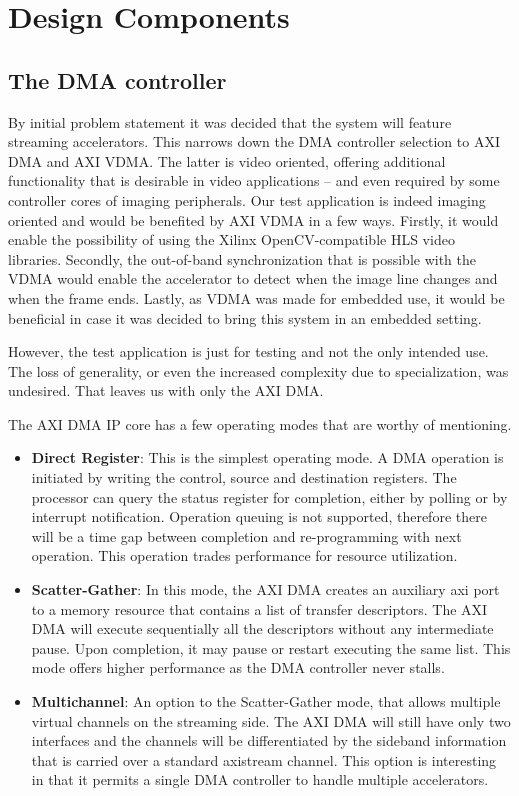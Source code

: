 \section{Design Components}

\subsection{The DMA controller}
\label{sec:axidma}

By initial problem statement it was decided that the system will feature
streaming accelerators. This narrows down the DMA controller selection
to AXI DMA and AXI VDMA. The latter is video oriented, offering additional
functionality that is desirable in video applications -- and even required
by some controller cores of imaging peripherals. Our test application
is indeed imaging oriented and would be benefited by AXI VDMA in a few ways.
Firstly, it would enable the possibility of using the Xilinx OpenCV-compatible
HLS video libraries. Secondly, the out-of-band synchronization that is possible
with the VDMA would enable the accelerator to detect when the image line changes
and when the frame ends. Lastly, as VDMA was made for embedded use, it would be
beneficial in case it was decided to bring this system in an embedded setting.

However, the test application is just for testing and not the only intended use.
The loss of generality, or even the increased complexity due to specialization,
was undesired. That leaves us with only the AXI DMA.

The AXI DMA IP core has a few operating modes that are worthy of mentioning.

\begin{itemize}
\item	\textbf{Direct Register}: 
	This is the simplest operating mode. A DMA operation is initiated 
	by writing the control, source and destination registers.
	The processor can query the status register for completion, 
	either by polling or by interrupt notification.
	Operation queuing is not supported, therefore there will be a time gap 
	between completion and re-programming with next operation.
	This operation trades performance for resource utilization.
\item	\textbf{Scatter-Gather}:
	In this mode, the AXI DMA creates an auxiliary \gls{axi} port
	to a memory resource that contains a list of transfer descriptors.
	The AXI DMA will execute sequentially all the descriptors without
	any intermediate pause. Upon completion, it may pause or restart
	executing the same list. This mode offers higher performance 
	as the DMA controller never stalls.
\item	\textbf{Multichannel}: 
	An option to the Scatter-Gather mode,
	that allows multiple virtual channels on the streaming side.
	The AXI DMA will still have only two interfaces and the channels
	will be differentiated by the sideband information that is carried
	over a standard \gls{axistream} channel. This option is interesting
	in that it permits a single DMA controller to handle multiple accelerators.
\end{itemize}


